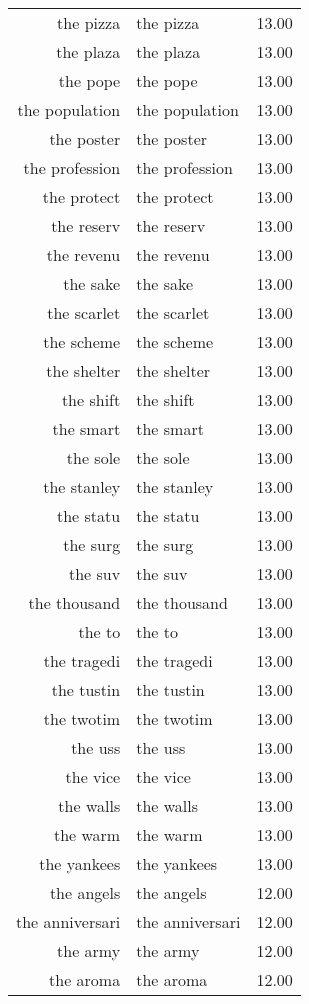\begin{table}[ht]
\begin{tabular}{rlr}
  the pizza & the pizza & 13.00 \\ 
  the plaza & the plaza & 13.00 \\ 
  the pope & the pope & 13.00 \\ 
  the population & the population & 13.00 \\ 
  the poster & the poster & 13.00 \\ 
  the profession & the profession & 13.00 \\ 
  the protect & the protect & 13.00 \\ 
  the reserv & the reserv & 13.00 \\ 
  the revenu & the revenu & 13.00 \\ 
  the sake & the sake & 13.00 \\ 
  the scarlet & the scarlet & 13.00 \\ 
  the scheme & the scheme & 13.00 \\ 
  the shelter & the shelter & 13.00 \\ 
  the shift & the shift & 13.00 \\ 
  the smart & the smart & 13.00 \\ 
  the sole & the sole & 13.00 \\ 
  the stanley & the stanley & 13.00 \\ 
  the statu & the statu & 13.00 \\ 
  the surg & the surg & 13.00 \\ 
  the suv & the suv & 13.00 \\ 
  the thousand & the thousand & 13.00 \\ 
  the to & the to & 13.00 \\ 
  the tragedi & the tragedi & 13.00 \\ 
  the tustin & the tustin & 13.00 \\ 
  the twotim & the twotim & 13.00 \\ 
  the uss & the uss & 13.00 \\ 
  the vice & the vice & 13.00 \\ 
  the walls & the walls & 13.00 \\ 
  the warm & the warm & 13.00 \\ 
  the yankees & the yankees & 13.00 \\ 
  the angels & the angels & 12.00 \\ 
  the anniversari & the anniversari & 12.00 \\ 
  the army & the army & 12.00 \\ 
  the aroma & the aroma & 12.00 \\ 

\end{tabular}
\end{table}

